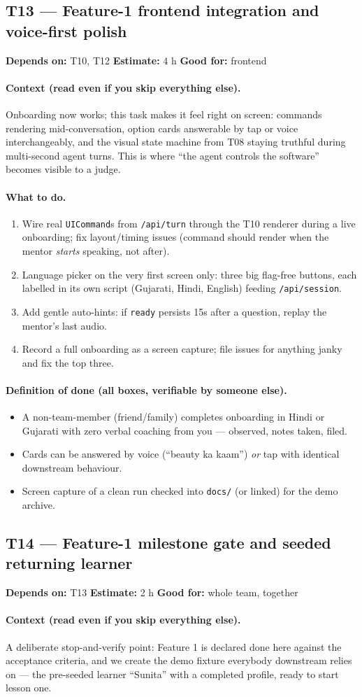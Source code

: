 \documentclass[11pt]{article}
\newcommand{\code}[1]{\texttt{#1}}
\newcommand{\taskmeta}[3]{\noindent\textbf{Depends on:} #1 \quad\textbullet\quad \textbf{Estimate:} #2 \quad\textbullet\quad \textbf{Good for:} #3\par\vspace{2pt}}
\newcommand{\ctx}[1]{\paragraph{Context (read even if you skip everything else).} #1}
\newcommand{\dod}{\paragraph{Definition of done (all boxes, verifiable by someone else).}}
\begin{document}
\subsection{T13 --- Feature-1 frontend integration and voice-first polish}
\taskmeta{T10, T12}{4 h}{frontend}
\ctx{Onboarding now works; this task makes it feel right on screen: commands rendering mid-conversation, option cards answerable by tap or voice interchangeably, and the visual state machine from T08 staying truthful during multi-second agent turns. This is where ``the agent controls the software'' becomes visible to a judge.}
\paragraph{What to do.}
\begin{enumerate}
  \item Wire real \code{UICommand}s from \code{/api/turn} through the T10 renderer during a live onboarding; fix layout/timing issues (command should render when the mentor \emph{starts} speaking, not after).
  \item Language picker on the very first screen only: three big flag-free buttons, each labelled in its own script (Gujarati, Hindi, English) feeding \code{/api/session}.
  \item Add gentle auto-hints: if \code{ready} persists 15s after a question, replay the mentor's last audio.
  \item Record a full onboarding as a screen capture; file issues for anything janky and fix the top three.
\end{enumerate}
\dod
\begin{itemize}
  \item A non-team-member (friend/family) completes onboarding in Hindi or Gujarati with zero verbal coaching from you --- observed, notes taken, filed.
  \item Cards can be answered by voice (``beauty ka kaam'') \emph{or} tap with identical downstream behaviour.
  \item Screen capture of a clean run checked into \code{docs/} (or linked) for the demo archive.
\end{itemize}

\subsection{T14 --- Feature-1 milestone gate and seeded returning learner}
\taskmeta{T13}{2 h}{whole team, together}
\ctx{A deliberate stop-and-verify point: Feature 1 is declared done here against the acceptance criteria, and we create the demo fixture everybody downstream relies on --- the pre-seeded learner ``Sunita'' with a completed profile, ready to start lesson one.}
\end{document}
